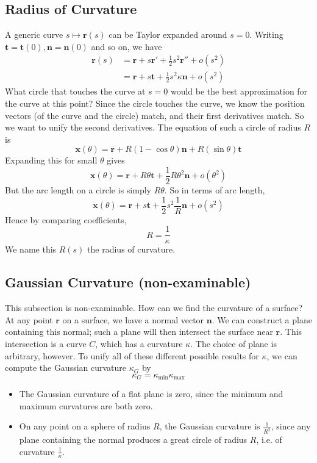 \documentclass{article}
\begin{document}
\subsection{Radius of Curvature}
A generic curve $s \mapsto \bm r(s)$ can be Taylor expanded around $s=0$. Writing $\bm t = \bm t(0), \bm n = \bm n(0)$ and so on, we have
\begin{align*}
    \bm r(s) & = \bm r + s\bm r' + \frac{1}{2}s^2 \bm r'' + o(s^2)    \\
             & = \bm r + s\bm t + \frac{1}{2}s^2 \kappa\bm n + o(s^2)
\end{align*}
What circle that touches the curve at $s=0$ would be the best approximation for the curve at this point? Since the circle touches the curve, we know the position vectors (of the curve and the circle) match, and their first derivatives match. So we want to unify the second derivatives. The equation of such a circle of radius $R$ is
\[ \bm x(\theta) = \bm r + R(1 - \cos \theta)\bm n + R(\sin \theta) \bm t \]
Expanding this for small $\theta$ gives
\[ \bm x(\theta) = \bm r + R\theta\bm t + \frac{1}{2} R\theta^2\bm n + o(\theta^2) \]
But the arc length on a circle is simply $R\theta$. So in terms of arc length,
\[ \bm x(\theta) = \bm r + s\bm t + \frac{1}{2} s^2 \frac{1}{R}\bm n + o(s^2) \]
Hence by comparing coefficients,
\[ R = \frac{1}{\kappa} \]
We name this $R(s)$ the radius of curvature.

\subsection{Gaussian Curvature (non-examinable)}
This subsection is non-examinable. How can we find the curvature of a surface? At any point $\bm r$ on a surface, we have a normal vector $\bm n$. We can construct a plane containing this normal; such a plane will then intersect the surface near $\bm r$. This intersection is a curve $C$, which has a curvature $\kappa$. The choice of plane is arbitrary, however. To unify all of these different possible results for $\kappa$, we can compute the Gaussian curvature $\kappa_G$ by
\[ \kappa_G = \kappa_{\text{min}} \kappa_{\text{max}} \]
\begin{itemize}
    \item The Gaussian curvature of a flat plane is zero, since the minimum and maximum curvatures are both zero.
    \item On any point on a sphere of radius $R$, the Gaussian curvature is $\frac{1}{R^2}$, since any plane containing the normal produces a great circle of radius $R$, i.e. of curvature $\frac{1}{\kappa}$.
\end{itemize}
\end{document}
